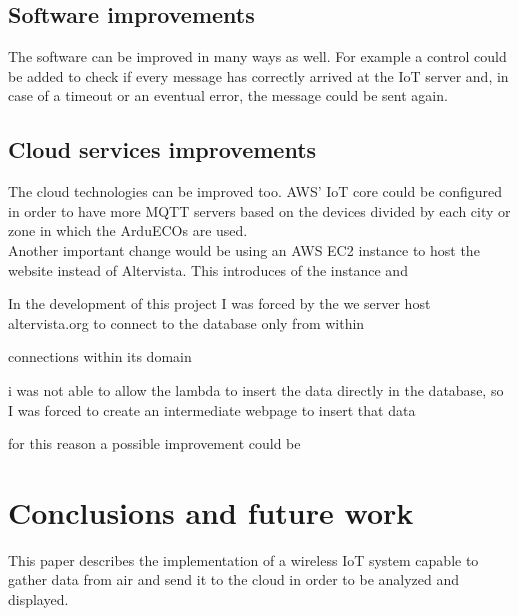 \documentclass[conference]{IEEEtran}
\begin{document}
	\subsection{Software improvements}
		The software can be improved in many ways as well.
		For example a control could be added to check if every message has correctly arrived at the IoT server and, in case of a timeout or an eventual error, the message could be sent again.
		
	\subsection{Cloud services improvements}
		The cloud technologies can be improved too.
		AWS' IoT core could be configured in order to have more MQTT servers based on the devices divided by each city or zone in which the ArduECOs are used.\\
		Another important change would be using an AWS EC2 instance to host the website instead of Altervista.
		This introduces of the instance and 
		
		In the development of this project I was forced by the we server host altervista.org to connect to the database only from within
		
		connections within its domain
		
		i was not able to allow the lambda to insert the data directly in the database, so I was forced to create an intermediate webpage to insert that data
		
		for this reason a possible improvement could be 

\section{Conclusions and future work}
This paper describes the implementation of a wireless IoT system capable to gather data from air and send it to the cloud in order to be analyzed and displayed.
\end{document}
